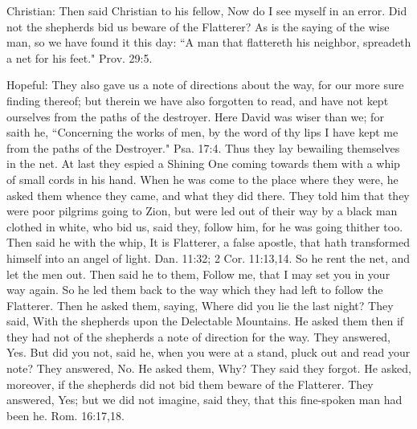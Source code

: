 Christian: Then said Christian to his fellow, Now do I see myself in an error. Did not the shepherds bid us beware of the Flatterer? As is the saying of the wise man, so we have found it this day: ``A man that flattereth his neighbor, spreadeth a net for his feet." Prov. 29:5.

Hopeful: They also gave us a note of directions about the way, for our more sure finding thereof; but therein we have also forgotten to read, and have not kept ourselves from the paths of the destroyer. Here David was wiser than we; for saith he, ``Concerning the works of men, by the word of thy lips I have kept me from the paths of the Destroyer." Psa. 17:4. Thus they lay bewailing themselves in the net. At last they espied a Shining One coming towards them with a whip of small cords in his hand. When he was come to the place where they were, he asked them whence they came, and what they did there. They told him that they were poor pilgrims going to Zion, but were led out of their way by a black man clothed in white, who bid us, said they, follow him, for he was going thither too. Then said he with the whip, It is Flatterer, a false apostle, that hath transformed himself into an angel of light. Dan. 11:32; 2 Cor. 11:13,14. So he rent the net, and let the men out. Then said he to them, Follow me, that I may set you in your way again. So he led them back to the way which they had left to follow the Flatterer. Then he asked them, saying, Where did you lie the last night? They said, With the shepherds upon the Delectable Mountains. He asked them then if they had not of the shepherds a note of direction for the way. They answered, Yes. But did you not, said he, when you were at a stand, pluck out and read your note? They answered, No. He asked them, Why? They said they forgot. He asked, moreover, if the shepherds did not bid them beware of the Flatterer. They answered, Yes; but we did not imagine, said they, that this fine-spoken man had been he. Rom. 16:17,18.

